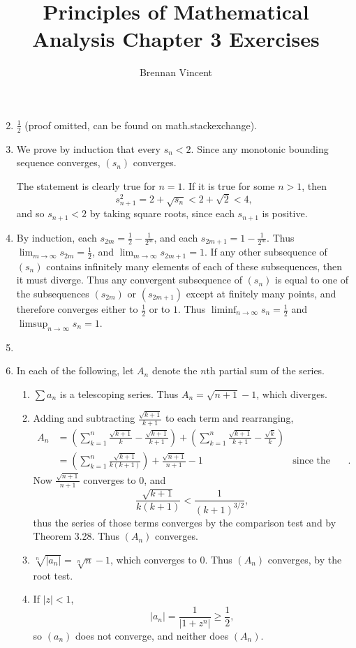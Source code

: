 \documentclass{article}
\title{Principles of Mathematical Analysis Chapter 3 Exercises}
\author{Brennan Vincent}
\newcommand{\li}[2][n] {
  \liminf_{#1\to\infty} #2 
}
\newcommand{\ls}[2][n] {
  \limsup_{#1\to\infty} #2
}
\begin{document}
\maketitle
\begin{enumerate}[label=\textbf{\arabic*.}]
\setcounter{enumi}{1}
\item $\frac{1}{2}$ (proof omitted, can be found on math.stackexchange).
\item We prove by induction that every $s_n < 2$. Since any monotonic bounding sequence converges, $(s_n)$ converges.

The statement is clearly true for $n=1$. If it is true for some $n > 1$, then \[s_{n+1}^2 = 2+\sqrt{s_n} < 2 + \sqrt{2} < 4,\] and so $s_{n+1} < 2$ by taking square roots, since each $s_{n+1}$ is positive.
\item By induction, each $s_{2m} = \frac{1}{2} - \frac{1}{2^m}$, and each $s_{2m+1} = 1 - \frac{1}{2^m}$. Thus $\lim_{m\to\infty} s_{2m} = \frac{1}{2}$, and $\lim_{m\to\infty} s_{2m+1} = 1$. If any other subsequence of $(s_n)$ contains infinitely many elements of each of these subsequences, then it must diverge. Thus any convergent subsequence of $(s_n)$ is equal to one of the subsequences $(s_{2m})$ or $(s_{2m+1})$ except at finitely many points, and therefore converges either to $\frac{1}{2}$ or to $1$. Thus $\li s_n = \frac{1}{2}$ and $\ls s_n = 1$.
\item
\item In each of the following, let $A_n$ denote the $n$th partial sum of the series.
\begin{enumerate}
\item $\sum a_n$ is a telescoping series. Thus $A_n = \sqrt{n+1} - 1$, which diverges.
\item Adding and subtracting $\frac{\sqrt{k+1}}{k+1}$ to each term and rearranging,
\begin{align*}
A_n &= \left(\sum_{k=1}^n \frac{\sqrt{k+1}}{k} - \frac{\sqrt{k+1}}{k+1}\right) + \left(\sum_{k=1}^n \frac{\sqrt{k+1}}{k+1} - \frac{\sqrt k}{k}\right)\\
&= \left(\sum_{k=1}^n\frac{\sqrt{k+1}}{k(k+1)}\right) + \frac{\sqrt{n+1}}{n+1} - 1&\text{since the second sum above is telescoping}.
\end{align*}
Now $\frac{\sqrt{n+1}}{n+1}$ converges to $0$, and \[\frac{\sqrt{k+1}}{k(k+1)} < \frac{1}{(k+1)^{3/2}},\] thus the series of those terms converges by the comparison test and by Theorem 3.28. Thus $(A_n)$ converges.
\item $\sqrt[n]{|a_n|} = \sqrt[n]{n} - 1$, which converges to $0$. Thus $(A_n)$ converges, by the root test.
\item
If $|z| < 1$, \[|a_n| = \frac{1}{|1+z^n|} \geq \frac{1}{2},\] so $(a_n)$ does not converge, and neither does $(A_n)$.


\end{enumerate}
\end{enumerate}
\end{document}
